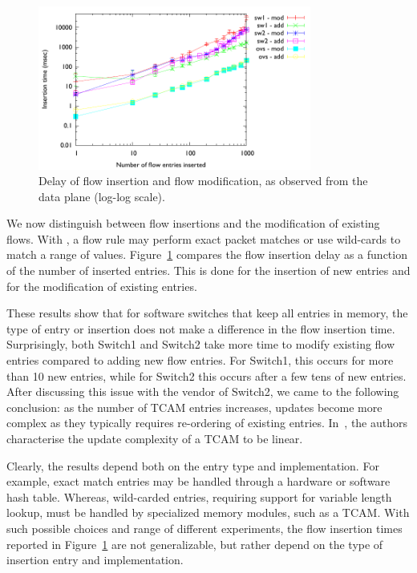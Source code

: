 \begin{figure}[h]
  \begin{center}
    \includegraphics[width=0.80\textwidth]{flow_insertion_delay}
  \end{center}
  \caption{Delay of flow insertion and flow modification, as observed
    from the data plane (log-log scale).}
  \label{fig:flow_insertion_delay}
\end{figure}

We now distinguish between flow insertions and the modification of existing
flows.  With \of, a flow rule may perform exact packet matches or use
wild-cards to match a range of values. Figure~\ref{fig:flow_insertion_delay}
compares the flow insertion delay as a function of the number of inserted
entries. This is done for the insertion of new entries and for the modification
of existing entries.

These results show that for software switches that keep all entries in memory,
the type of entry or insertion does not make a difference in the flow insertion
time.  Surprisingly, both Switch1 and Switch2 take more time to modify existing
flow entries compared to adding new flow entries.  For Switch1, this occurs for
more than 10 new entries, while for Switch2 this occurs after a few tens of new
entries.  After discussing this issue with the vendor of Switch2, we came to the
following conclusion: as the number of TCAM entries increases, updates become
more complex as they typically requires re-ordering of existing entries.
In~\cite{Gupta01}, the authors characterise the update complexity of a TCAM to
be linear. 

Clearly, the results depend both on the entry type and implementation.  For
example, exact match entries may be handled through a hardware or software hash
table. Whereas, wild-carded entries, requiring support for variable length
lookup, must be handled by specialized memory modules, such as a TCAM. With such
possible choices and range of different experiments, the flow insertion times
reported in Figure~\ref{fig:flow_insertion_delay} are not generalizable, but
rather depend on the type of insertion entry and implementation.

